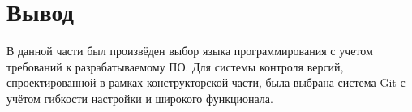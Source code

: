 \section{Вывод} \label{technologic_conclusion}

В данной части был произвёден выбор языка программирования с учетом требований к разрабатываемому ПО. Для системы контроля версий, спроектированной в рамках конструкторской части, была выбрана система Git с учётом гибкости настройки и широкого функционала.
